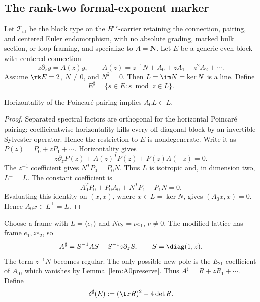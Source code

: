 \subsection{The rank-two formal-exponent marker}

Let \(\mathcal T_{\mathrm{at}}\) be the block type on the
\(H^{\mathrm{ev}}\)-carrier retaining the connection, pairing, and centered
Euler endomorphism, with no absolute grading, marked bulk section, or loop
framing, and specialize to \(A=\mathbf N\).  Let \(E\) be a generic even block
with centered connection
\begin{equation}
 z\partial_z y=A(z)y,
 \qquad A(z)=z^{-1}N+A_0+zA_1+z^2A_2+\cdots.
 \label{eq:atomic-block-expansion}
\end{equation}
Assume \(\rk E=2\), \(N\ne0\), and \(N^2=0\).  Then
\(L=\im N=\ker N\) is a line.  Define
\begin{equation}
 E^\sharp=\{s\in E:s\bmod z\in L\}.
 \label{eq:atomic-modification}
\end{equation}

\begin{lemma}
\label{lem:A0preserve}
%
%
Horizontality of the Poincar\'e pairing implies \(A_0L\subset L\).
\end{lemma}

\begin{proof}
Separated spectral factors are orthogonal for the horizontal Poincar\'e
pairing: coefficientwise horizontality kills every off-diagonal block by an
invertible Sylvester operator.  Hence the restriction to \(E\) is
nondegenerate.  Write it as \(P(z)=P_0+zP_1+\cdots\).  Horizontality gives
\[
 z\partial_zP(z)+A(z)^TP(z)+P(z)A(-z)=0.
\]
The \(z^{-1}\) coefficient gives \(N^TP_0=P_0N\).  Thus \(L\) is isotropic
and, in dimension two, \(L^\perp=L\).  The constant coefficient is
\[
 A_0^TP_0+P_0A_0+N^TP_1-P_1N=0.
\]
Evaluating this identity on \((x,x)\), where \(x\in L=\ker N\), gives
\((A_0x,x)=0\).  Hence \(A_0x\in L^\perp=L\).
\end{proof}

Choose a frame with \(L=\langle e_1\rangle\) and
\(Ne_2=\nu e_1\), \(\nu\ne0\).  The modified lattice has frame
\(e_1,ze_2\), so
\begin{equation}
 A^\sharp=S^{-1}AS-S^{-1}z\partial_zS,
 \qquad S=\diag(1,z).
 \label{eq:Asharp}
\end{equation}
The term \(z^{-1}N\) becomes regular.  The only possible new pole is the
\(E_{21}\)-coefficient of \(A_0\), which vanishes by
Lemma~\ref{lem:A0preserve}.  Thus
\(A^\sharp=R+zR_1+\cdots\).  Define
\begin{equation}
 \delta^\sharp(E):=(\tr R)^2-4\det R.
 \label{eq:res-disc}
\end{equation}


